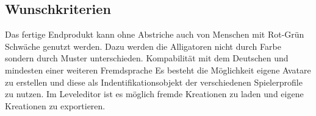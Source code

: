 \subsection{Wunschkriterien}

\begin{requirements}
	Das fertige Endprodukt kann ohne Abstriche auch von Menschen mit Rot-Grün Schwäche genutzt werden. Dazu werden die Alligatoren nicht durch Farbe sondern durch Muster unterschieden.
	Kompabilität mit dem Deutschen und mindesten einer weiteren Fremdsprache
	Es besteht die Möglichkeit eigene Avatare zu erstellen und diese als Indentifikationsobjekt der verschiedenen Spielerprofile zu nutzen.
	Im Leveleditor ist es möglich fremde Kreationen zu laden und eigene Kreationen zu exportieren.
\end{requirements}
